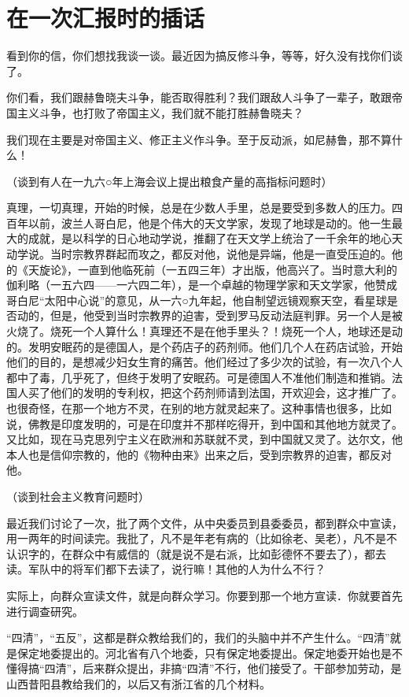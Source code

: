 \section[在一次汇报时的插话（一九六四年三月）]{在一次汇报时的插话}

看到你的信，你们想找我谈一谈。最近因为搞反修斗争，等等，好久没有找你们谈了。

你们看，我们跟赫鲁晓夫斗争，能否取得胜利？我们跟敌人斗争了一辈子，敢跟帝国主义斗争，也打败了帝国主义，我们就不能打胜赫鲁晓夫？

我们现在主要是对帝国主义、修正主义作斗争。至于反动派，如尼赫鲁，那不算什么！

（谈到有人在一九六○年上海会议上提出粮食产量的高指标问题时）

真理，一切真理，开始的时候，总是在少数人手里，总是要受到多数人的压力。四百年以前，波兰人哥白尼，他是个伟大的天文学家，发现了地球是动的。他一生最大的成就，是以科学的日心地动学说，推翻了在天文学上统治了一千余年的地心天动学说。当时宗教界群起而攻之，都反对他，说他是异端，他是一直受压迫的。他的《天旋论》，一直到他临死前（一五四三年）才出版，他高兴了。当时意大利的伽利略（一五六四——一六四二年），是一个卓越的物理学家和天文学家，他赞成哥白尼“太阳中心说”的意见，从一六○九年起，他自制望远镜观察天空，看星球是否动的，但是，他受到当时宗教界的迫害，受到罗马反动法庭判罪。另一个人是被火烧了。烧死一个人算什么！真理还不是在他手里头？！烧死一个人，地球还是动的。发明安眠药的是德国人，是个药店子的药剂师。他们几个人在药店试验，开始他们的目的，是想减少妇女生育的痛苦。他们经过了多少次的试验，有一次八个人都中了毒，几乎死了，但终于发明了安眠药。可是德国人不准他们制造和推销。法国人买了他们的发明的专利权，把这个药剂师请到法国，开欢迎会，这才推广了。也很奇怪，在那一个地方不灵，在别的地方就灵起来了。这种事情也很多，比如说，佛教是印度发明的，可是在印度并不那样吃得开，到中国和其他地方就灵了。又比如，现在马克思列宁主义在欧洲和苏联就不灵，到中国就又灵了。达尔文，他本人也是信仰宗教的，他的《物种由来》出来之后，受到宗教界的迫害，都反对他。

（谈到社会主义教育问题时）

最近我们讨论了一次，批了两个文件，从中央委员到县委委员，都到群众中宣读，用一两年的时间读完。我批了，凡不是年老有病的（比如徐老、吴老），凡不是不认识字的，在群众中有威信的（就是说不是右派，比如彭德怀不要去了），都去读。军队中的将军们都下去读了，说行嘛！其他的人为什么不行？

实际上，向群众宣读文件，就是向群众学习。你要到那一个地方宣读．你就要首先进行调查研究。

“四清”，“五反”，这都是群众教给我们的，我们的头脑中并不产生什么。“四清”就是保定地委提出的。河北省有八个地委，只有保定地委提出。保定地委开始也是不懂得搞“四清”，后来群众提出，非搞“四清”不行，他们接受了。干部参加劳动，是山西昔阳县教给我们的，以后又有浙江省的几个材料。

